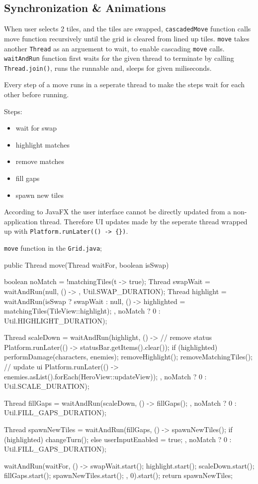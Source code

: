 \documentclass[a4paper]{article}
\begin{document}
\newpage
\subsection*{Synchronization \& Animations}
\label{sec:org3b82fb3}

When user selects 2 tiles, and the tiles are swapped, \texttt{cascadedMove} function calls move function recursively until the grid is cleared from lined up tiles.
\texttt{move} takes another \texttt{Thread} as an arguement to wait, to enable cascading \texttt{move} calls.
\texttt{waitAndRun} function first waits for the given thread to terminate by calling \texttt{Thread.join()}, runs the runnable and, sleeps for given miliseconds.

Every step of a move runs in a seperate thread to make the steps wait for each other before running.

Steps:
\begin{itemize}
\item wait for swap
\item highlight matches
\item remove matches
\item fill gaps
\item spawn new tiles
\end{itemize}

According to JavaFX the user interface cannot be directly updated from a non-application thread.
Therefore UI updates made by the seperate thread wrapped up with \texttt{Platform.runLater(() -> \{\})}.

\texttt{move} function in the \texttt{Grid.java};

\begin{javacode}
public Thread move(Thread waitFor, boolean isSwap) {
  boolean noMatch = !matchingTiles(t -> true);
  Thread swapWait = waitAndRun(null, () -> {
  }, Util.SWAP_DURATION);
  Thread highlight = waitAndRun(isSwap ? swapWait : null, () -> {
    highlighted = matchingTiles(TileView::highlight);
  }, noMatch ? 0 : Util.HIGHLIGHT_DURATION);

  Thread scaleDown = waitAndRun(highlight, () -> {
    // remove status
    Platform.runLater(() -> statusBar.getItems().clear());
    if (highlighted) {
      performDamage(characters, enemies);
      removeHighlight();
      removeMatchingTiles();
      // update ui
      Platform.runLater(() -> enemies.asList().forEach(HeroView::updateView));
    }
  }, noMatch ? 0 : Util.SCALE_DURATION);

  Thread fillGaps = waitAndRun(scaleDown, () -> {
    fillGaps();
  }, noMatch ? 0 : Util.FILL_GAPS_DURATION);

  Thread spawnNewTiles = waitAndRun(fillGaps, () -> {
    spawnNewTiles();
    if (highlighted) {
      changeTurn();
    } else {
      userInputEnabled = true;
    }
  }, noMatch ? 0 : Util.FILL_GAPS_DURATION);

  waitAndRun(waitFor, () -> {
    swapWait.start();
    highlight.start();
    scaleDown.start();
    fillGaps.start();
    spawnNewTiles.start();
  }, 0).start();
  return spawnNewTiles;
}
\end{javacode}
\end{document}
